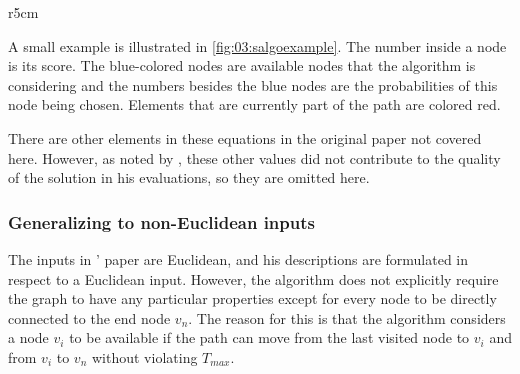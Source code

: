 \begin{wrapfigure}{r}{5cm}
    \centering
    \caption{The S-Algorithm at work.}
    \label{fig:03:salgoexample}
\end{wrapfigure}

A small example is illustrated in \cref{fig:03:salgoexample}.
The number inside a node is its score. 
The blue-colored nodes are available nodes that the algorithm is considering and the numbers besides the blue nodes are the probabilities of this node being chosen.
Elements that are currently part of the path are colored red.

There are other elements in these equations in the original paper not covered here.
However, as noted by \citeauthor{tsiligiridis_heuristic_1984}, these other values did not contribute to the quality of the solution in his evaluations, so they are omitted here. 

\subsubsection{Generalizing to non-Euclidean inputs}

The inputs in \citeauthor{tsiligiridis_heuristic_1984}' paper are Euclidean, and his descriptions are formulated in respect to a Euclidean input.
However, the algorithm does not explicitly require the graph to have any particular properties except for every node to be directly connected to the end node $v_n$.
The reason for this is that the algorithm considers a node $v_i$ to be available if the path can move from the last visited node to $v_i$ and from $v_i$ to $v_n$ without violating $T_{max}$.

